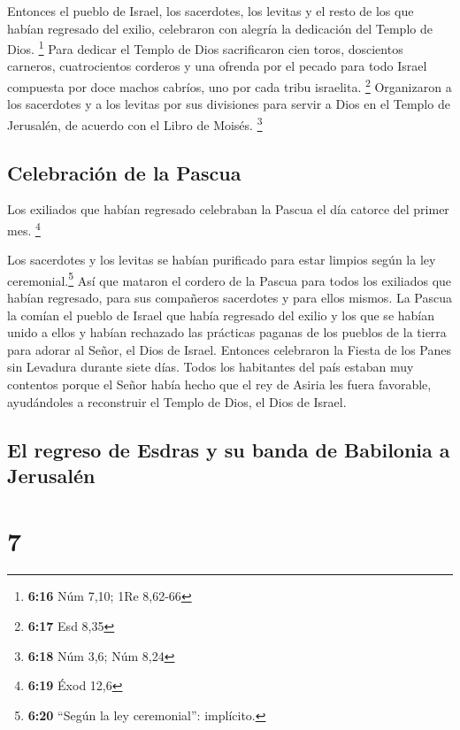  Entonces el pueblo de Israel, los sacerdotes, los
levitas y el resto de los que habían regresado del exilio, celebraron
con alegría la dedicación del Templo de Dios. \footnote{\textbf{6:16}
  Núm 7,10; 1Re 8,62-66}  Para dedicar el Templo de Dios
sacrificaron cien toros, doscientos carneros, cuatrocientos corderos y
una ofrenda por el pecado para todo Israel compuesta por doce machos
cabríos, uno por cada tribu israelita. \footnote{\textbf{6:17} Esd 8,35}
 Organizaron a los sacerdotes y a los levitas por sus
divisiones para servir a Dios en el Templo de Jerusalén, de acuerdo con
el Libro de Moisés. \footnote{\textbf{6:18} Núm 3,6; Núm 8,24}

\hypertarget{celebraciuxf3n-de-la-pascua}{%
\subsection{Celebración de la
Pascua}\label{celebraciuxf3n-de-la-pascua}}

 Los exiliados que habían regresado celebraban la Pascua
el día catorce del primer mes. \footnote{\textbf{6:19} Éxod 12,6}

 Los sacerdotes y los levitas se habían purificado para
estar limpios según la ley ceremonial.\footnote{\textbf{6:20} ``Según la
  ley ceremonial'': implícito.} Así que mataron el cordero de la Pascua
para todos los exiliados que habían regresado, para sus compañeros
sacerdotes y para ellos mismos.  La Pascua la comían el
pueblo de Israel que había regresado del exilio y los que se habían
unido a ellos y habían rechazado las prácticas paganas de los pueblos de
la tierra para adorar al Señor, el Dios de Israel. 
Entonces celebraron la Fiesta de los Panes sin Levadura durante siete
días. Todos los habitantes del país estaban muy contentos porque el
Señor había hecho que el rey de Asiria les fuera favorable, ayudándoles
a reconstruir el Templo de Dios, el Dios de Israel.

\hypertarget{el-regreso-de-esdras-y-su-banda-de-babilonia-a-jerusaluxe9n}{%
\subsection{El regreso de Esdras y su banda de Babilonia a
Jerusalén}\label{el-regreso-de-esdras-y-su-banda-de-babilonia-a-jerusaluxe9n}}

\hypertarget{section-6}{%
\section{7}\label{section-6}}


